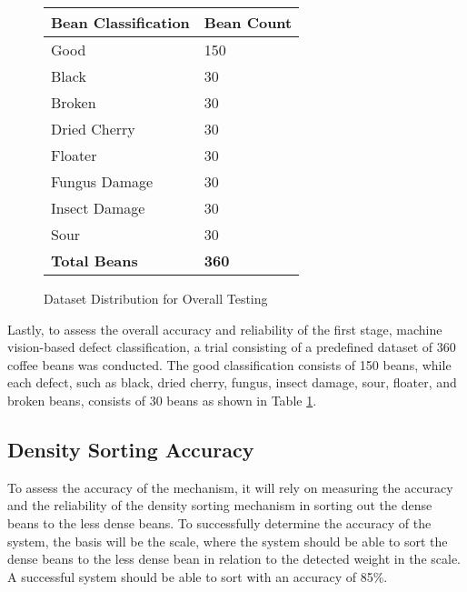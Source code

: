\begin{figure}[H]
	\centering
	\begin{tabularx}{\textwidth}{p{}|p{}}
		\caption{Dataset Distribution for Overall Testing} \label{tab:dataset_distribution} \\
		\hline \hline
		\textbf{Bean Classification} & \textbf{Bean Count} \\
		\hline
		Good & 150 \\
		\hline
		Black &  30 \\
		\hline
		Broken & 30 \\
		\hline
		Dried Cherry & 30 \\
		\hline
		Floater & 30 \\
		\hline
		Fungus Damage & 30 \\
		\hline
		Insect Damage & 30 \\
		\hline
		Sour & 30 \\
		\hline
		\textbf{Total Beans} & \textbf{360} \\
		\hline
	\end{tabularx}
\end{figure}

Lastly, to assess the overall accuracy and reliability of the first stage, machine vision-based defect classification,  a trial consisting of a predefined dataset of 360 coffee beans was conducted. The good classification consists of 150 beans, while each defect, such as black, dried cherry, fungus, insect damage, sour, floater, and broken beans, consists of 30 beans as shown in Table \ref{tab:dataset_distribution}.

\subsection{Density Sorting Accuracy}

To assess the accuracy of the mechanism, it will rely on measuring the accuracy and the reliability of the density sorting mechanism in sorting out the dense beans to the less dense beans. To successfully determine the accuracy of the system, the basis will be the scale, where the system should be able to sort the dense beans to the less dense bean in relation to the detected weight in the scale. A successful system should be able to sort with an accuracy of 85\%.
